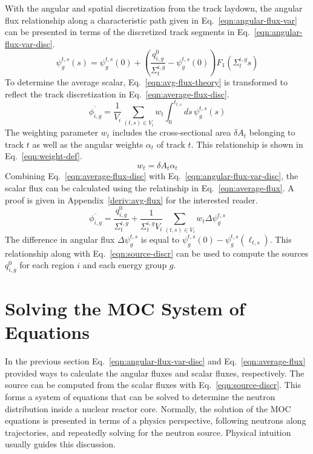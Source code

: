 With the angular and spatial discretization from the track laydown, the angular flux relationship along a characteristic path given in Eq.~\ref{eqn:angular-flux-var} can be presented in terms of the discretized track segments in Eq.~\ref{eqn:angular-flux-var-disc}.
\begin{dmath}
	\psi_g^{t,s}(s) = \psi^{t,s}_g(0) + \left( \frac{q^0_{i,g}}{\Sigma_{t}^{i,g}} - \psi_g^{t,s}(0) \right) F_1\left(\Sigma_{t}^{i,g} s \right)
	\label{eqn:angular-flux-var-disc}
\end{dmath}
To determine the average scalar, Eq.~\ref{eqn:avg-flux-theory} is transformed to reflect the track discretization in Eq.~\ref{eqn:average-flux-disc}.
\begin{dmath}
	\overline{\phi_{i,g}} = \frac{1}{V_i} \sum_{(t,s) \in V_i} w_{t} \int_{0}^{\ell_{t,s}} ds \, \psi^{t,s}_g(s)
	\label{eqn:average-flux-disc}
\end{dmath}
The weighting parameter $w_t$ includes the cross-sectional area $\delta A_{t}$ belonging to track $t$ as well as the angular weights $\alpha_t$ of track $t$. This relationship is shown in Eq.~\ref{eqn:weight-def}.
\begin{equation}
 w_{t} = \delta A_{t} \alpha_t
 \label{eqn:weight-def}
\end{equation}
Combining Eq.~\ref{eqn:average-flux-disc} with Eq.~\ref{eqn:angular-flux-var-disc}, the scalar flux can be calculated using the relatinship in Eq.~\ref{eqn:average-flux}. A proof is given in Appendix~\ref{deriv:avg-flux} for the interested reader.
\begin{dmath}
	\overline{\phi_{i,g}} = \frac{q^0_{i,g}}{\Sigma_{t}^{i,g}} + \frac{1}{\Sigma_{t}^{i,g} V_i} \sum_{(t,s) \in V_i} w_{t} \Delta \psi_g^{t,s}
	\label{eqn:average-flux}
\end{dmath}
The difference in angular flux $\Delta \psi_g^{t,s}$ is equal to $\psi_g^{t,s}(0) - \psi_g^{t,s}(\ell_{t,s})$. This relationship along with Eq.~\ref{eqn:source-discr} can be used to compute the sources $q^0_{i,g}$ for each region $i$ and each energy group $g$.


\section{Solving the MOC System of Equations}

In the previous section Eq.~\ref{eqn:angular-flux-var-disc} and Eq.~\ref{eqn:average-flux} provided ways to calculate the angular fluxes and scalar fluxes, respectively. The source can be computed from the scalar fluxes with Eq.~\ref{eqn:source-discr}. This forms a system of equations that can be solved to determine the neutron distribution inside a nuclear reactor core. Normally, the solution of the MOC equations is presented in terms of a physics perspective, following neutrons along trajectories, and repeatedly solving for the neutron source. Physical intuition usually guides this discussion.

